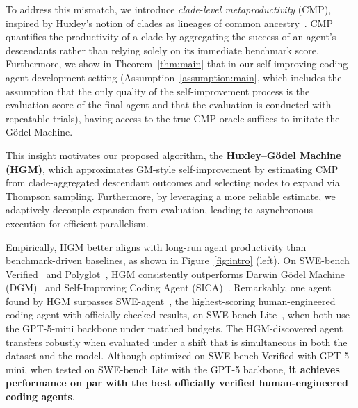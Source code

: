 \documentclass{article}
\begin{document}
To address this mismatch, we introduce \emph{clade-level metaproductivity} ($\mathrm{CMP}$), inspired by Huxley’s notion of clades as lineages of common ancestry~\citep{huxley1957three}. $\mathrm{CMP}$ quantifies the productivity of a clade by aggregating the success of an agent’s descendants rather than relying solely on its immediate benchmark score. 
Furthermore, we show in Theorem~\ref{thm:main} that in our self-improving coding agent development setting (Assumption~\ref{assumption:main}, which includes the assumption that the only quality of the self-improvement process is the evaluation score of the final agent and that the evaluation is conducted with repeatable trials), having access to the true $\mathrm{CMP}$ oracle suffices to imitate the G\"odel Machine. 

This insight motivates our proposed algorithm, the \textbf{Huxley–G\"odel Machine (HGM)}, which approximates GM-style self-improvement by estimating $\mathrm{CMP}$ from clade-aggregated descendant outcomes and selecting nodes to expand via Thompson sampling. Furthermore, by leveraging a more reliable estimate, we adaptively decouple expansion from evaluation, leading to asynchronous execution for efficient parallelism.

Empirically, HGM better aligns with long-run agent productivity than benchmark-driven baselines, as shown in Figure~\ref{fig:intro} (left). 
On SWE-bench Verified~\citep{jimenez2024swebench,chowdhury2024swebenchverified} and Polyglot~\citep{Gauthier2024polyglot}, HGM consistently outperforms Darwin G\"odel Machine (DGM)~\citep{zhang2025dgm} and Self-Improving Coding Agent (SICA)~\citep{robeyns2025selfimprovingcodingagent}. 
Remarkably, one agent found by HGM surpasses SWE-agent~\citep{yang2024swe}, the highest-scoring human-engineered coding agent with officially checked results, on SWE-bench Lite~\citep{jimenez2024swebench}, when both use the GPT-5-mini backbone under matched budgets. 
The HGM-discovered agent transfers robustly when evaluated under a shift that is simultaneous in both the dataset and the model. Although optimized on SWE-bench Verified with GPT-5-mini, when tested on SWE-bench Lite with the GPT-5 backbone, \textbf{it achieves performance on par with the best officially verified human-engineered coding agents}.
\end{document}
